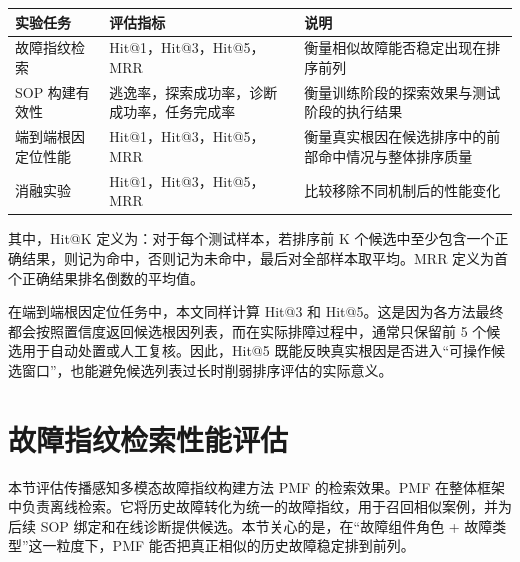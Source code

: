 \begin{table}[htbp]
    \centering
    \label{tab:evaluation_framework}
    \ChapFiveTableSetup
    \begin{tabularx}{\textwidth}{>{\raggedright\arraybackslash}p{2.8cm}>{\raggedright\arraybackslash}X>{\raggedright\arraybackslash}p{4.5cm}}
        \toprule
        \rowcolor{\ChapFiveTableHeadColor}
        \textbf{实验任务} & \textbf{评估指标} & \textbf{说明} \\
        \midrule
        故障指纹检索 & Hit@1，Hit@3，Hit@5，MRR & 衡量相似故障能否稳定出现在排序前列 \\
        SOP 构建有效性 & 逃逸率，探索成功率，诊断成功率，任务完成率 & 衡量训练阶段的探索效果与测试阶段的执行结果 \\
        端到端根因定位性能 & Hit@1，Hit@3，Hit@5，MRR & 衡量真实根因在候选排序中的前部命中情况与整体排序质量 \\
        消融实验 & Hit@1，Hit@3，Hit@5，MRR & 比较移除不同机制后的性能变化 \\
        \bottomrule
    \end{tabularx}
\end{table}

其中，Hit@K 定义为：对于每个测试样本，若排序前 K 个候选中至少包含一个正确结果，则记为命中，否则记为未命中，最后对全部样本取平均。MRR 定义为首个正确结果排名倒数的平均值。

在端到端根因定位任务中，本文同样计算 Hit@3 和 Hit@5。这是因为各方法最终都会按照置信度返回候选根因列表，而在实际排障过程中，通常只保留前 5 个候选用于自动处置或人工复核。因此，Hit@5 既能反映真实根因是否进入“可操作候选窗口”，也能避免候选列表过长时削弱排序评估的实际意义。





\section{故障指纹检索性能评估}

本节评估传播感知多模态故障指纹构建方法 PMF 的检索效果。PMF 在整体框架中负责离线检索。它将历史故障转化为统一的故障指纹，用于召回相似案例，并为后续 SOP 绑定和在线诊断提供候选。本节关心的是，在“故障组件角色 + 故障类型”这一粒度下，PMF 能否把真正相似的历史故障稳定排到前列。

